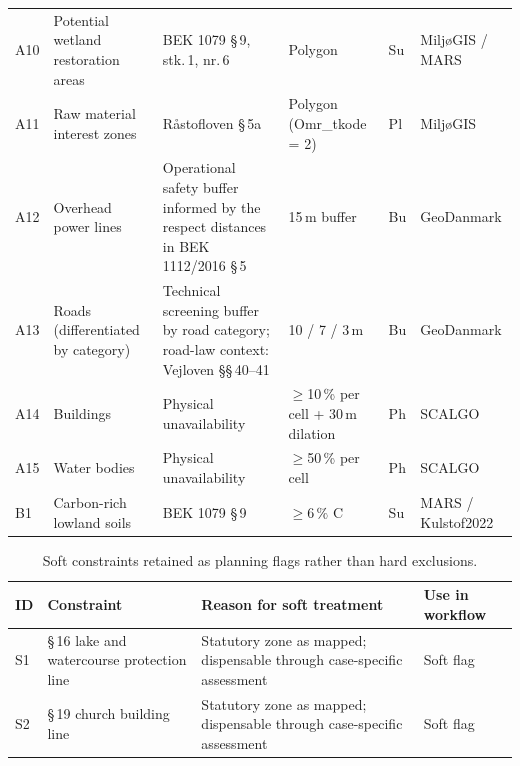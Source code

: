 \documentclass[land,article,submit,moreauthors]{Definitions/mdpi}
\begin{document}
\begin{table}[H]
\begin{tabular}{@{} p{0.5cm} p{3.2cm} p{3.9cm} p{2.0cm} p{0.6cm} p{1.9cm} @{}}
A10 & Potential wetland restoration areas
    & BEK 1079 \S\,9, stk.\,1, nr.\,6 \citep{bek1079_2025}
    & Polygon
    & Su
    & Milj{\o}GIS / MARS \\
A11 & Raw material interest zones
    & R{\aa}stofloven \S\,5a \citep{raastofloven2024}
    & Polygon (Omr\_tkode = 2)
    & Pl
    & Milj{\o}GIS \\
A12 & Overhead power lines
    & Operational safety buffer informed by the respect distances in BEK 1112/2016 \S\,5 \citep{bek1112_2016}
    & 15\,m buffer
    & Bu
    & GeoDanmark \\
A13 & Roads (differentiated by category)
    & Technical screening buffer by road category; road-law context: Vejloven \S\S\,40--41 \citep{vejloven2024}
    & 10 / 7 / 3\,m
    & Bu
    & GeoDanmark \\
A14 & Buildings
    & Physical unavailability
    & $\geq$10\,\% per cell + 30\,m dilation
    & Ph
    & SCALGO \\
A15 & Water bodies
    & Physical unavailability
    & $\geq$50\,\% per cell
    & Ph
    & SCALGO \\
B1  & Carbon-rich lowland soils
    & BEK 1079 \S\,9 \citep{bek1079_2025}
    & $\geq 6\,\%$ C
    & Su
    & MARS / Kulstof2022 \\
\bottomrule
\end{tabular}
\end{table}

\begin{table}[H]
\centering
\caption{Soft constraints retained as planning flags rather than hard exclusions.}
\label{tab:soft-constraints}
\footnotesize
\setlength{\tabcolsep}{4pt}
\renewcommand{\arraystretch}{1.15}
\begin{tabular}{@{} l p{4.2cm} p{5.6cm} l @{}}
\toprule
\textbf{ID} & \textbf{Constraint} & \textbf{Reason for soft treatment} & \textbf{Use in workflow} \\
\midrule
S1 & \S\,16 lake and watercourse protection line & Statutory zone as mapped; dispensable through case-specific assessment & Soft flag \\
S2 & \S\,19 church building line & Statutory zone as mapped; dispensable through case-specific assessment & Soft flag \\
\bottomrule
\end{tabular}
\end{table}

\end{document}
